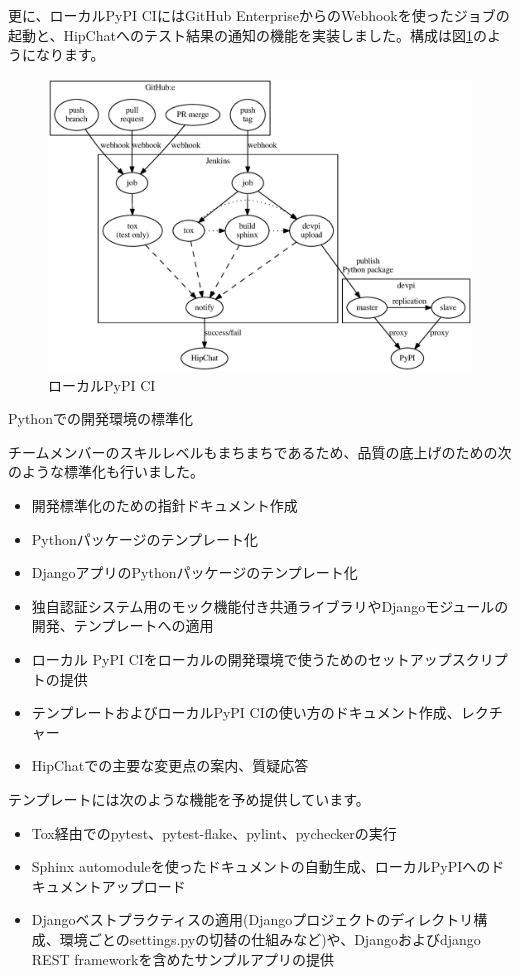 \documentclass[mingoth,a4paper]{jsarticle}
\begin{document}
更に、ローカルPyPI CIにはGitHub EnterpriseからのWebhookを使ったジョブの起動と、HipChatへのテスト結果の通知の機能を実装しました。構成は図\ref{fig:pypi-ci}のようになります。

\begin{figure}[h]
  \begin{center}
  \includegraphics[width=0.6\hsize]{image201504/python-ci.eps}
  \caption{ローカルPyPI CI}
  \label{fig:pypi-ci}
  \end{center}
\end{figure}

{\scriptsize
\begin{itembox}[l]{Pythonでの開発環境の標準化}

チームメンバーのスキルレベルもまちまちであるため、品質の底上げのための次のような標準化も行いました。

\begin{itemize}
\item 開発標準化のための指針ドキュメント作成
\item Pythonパッケージのテンプレート化
\item DjangoアプリのPythonパッケージのテンプレート化
\item 独自認証システム用のモック機能付き共通ライブラリやDjangoモジュールの開発、テンプレートへの適用
\item ローカル PyPI CIをローカルの開発環境で使うためのセットアップスクリプトの提供
\item テンプレートおよびローカルPyPI CIの使い方のドキュメント作成、レクチャー
\item HipChatでの主要な変更点の案内、質疑応答
\end{itemize}

テンプレートには次のような機能を予め提供しています。

\begin{itemize}
\item Tox経由でのpytest、pytest-flake、pylint、pycheckerの実行
\item Sphinx automoduleを使ったドキュメントの自動生成、ローカルPyPIへのドキュメントアップロード
\item Djangoベストプラクティスの適用(Djangoプロジェクトのディレクトリ構成、環境ごとのsettings.pyの切替の仕組みなど)や、Djangoおよびdjango REST frameworkを含めたサンプルアプリの提供
\end{itemize}
\end{itembox}}
\end{document}
